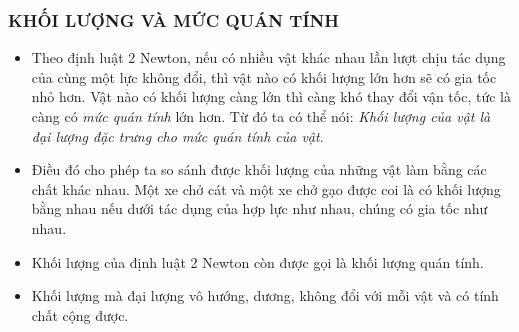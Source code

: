 \subsubsection{KHỐI LƯỢNG VÀ MỨC QUÁN TÍNH}
\begin{itemize}
\item Theo định luật 2 Newton, nếu có nhiều vật khác nhau lần lượt chịu tác dụng của cùng một lực không đổi, thì vật nào có khối lượng lớn hơn sẽ có gia tốc nhỏ hơn. Vật nào có khối lượng càng lớn thì càng khó thay đổi vận tốc, tức là càng có \textit{mức quán tính} lớn hơn. Từ đó ta có thể nói: \textit{Khối lượng của vật là đại lượng đặc trưng cho mức quán tính của vật}.
\item Điều đó cho phép ta so sánh được khối lượng của những vật làm bằng các chất khác nhau. Một xe chở cát và một xe chở gạo được coi là có khối lượng bằng nhau nếu dưới tác dụng của hợp lực như nhau, chúng có gia tốc như nhau.
\end{itemize}	
\begin{note}
\begin{itemize}
\item Khối lượng của định luật 2 Newton còn được gọi là khối lượng quán tính.
\item Khối lượng mà đại lượng vô hướng, dương, không đổi với mỗi vật và có tính chất cộng được.
\end{itemize}	
\end{note}




